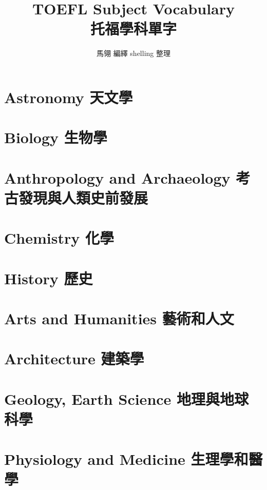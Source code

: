 \documentclass[twoside,b5paper]{book}
\begin{document}
  \title{TOEFL Subject Vocabulary\\\kai 托福學科單字}
  \author{\kai 馬翎 編繹 shelling 整理\rm}
  \maketitle

  \tableofcontents %

  \chapter{Astronomy \kai 天文學}
  


  \chapter{Biology \kai 生物學}

  \chapter{Anthropology and Archaeology \kai 考古發現與人類史前發展}

  \chapter{Chemistry \kai 化學}

  \chapter{History \kai 歷史}

  \chapter{Arts and Humanities \kai 藝術和人文}

  \chapter{Architecture \kai 建築學}

  \chapter{Geology, Earth Science \kai 地理與地球科學}

  \chapter{Physiology and Medicine \kai 生理學和醫學}
\end{document}
